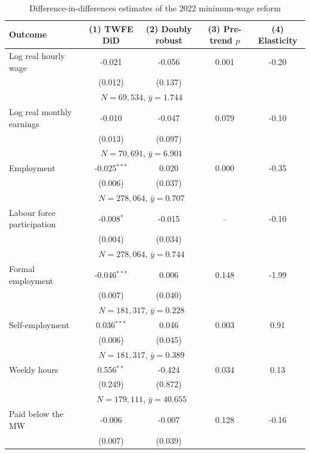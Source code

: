 \begin{table}[!tbp]\centering
\caption{Difference-in-differences estimates of the 2022 minimum-wage reform}\label{tab:main}
\begin{threeparttable}
\footnotesize
\setlength{\tabcolsep}{4pt}
\begin{tabular}{lcccc}
\toprule
Outcome & (1) TWFE DiD & (2) Doubly robust & (3) Pre-trend $p$ & (4) Elasticity \\
\midrule
Log real hourly wage & -0.021 & -0.056 & 0.001 & -0.20 \\
 & (0.012) & (0.137) & & \\
 & \multicolumn{2}{c}{\footnotesize $N=69,534$, $\bar{y}=1.744$} & & \\
Log real monthly earnings & -0.010 & -0.047 & 0.079 & -0.10 \\
 & (0.013) & (0.097) & & \\
 & \multicolumn{2}{c}{\footnotesize $N=70,691$, $\bar{y}=6.901$} & & \\
Employment & -0.025$^{***}$ & 0.020 & 0.000 & -0.35 \\
 & (0.006) & (0.037) & & \\
 & \multicolumn{2}{c}{\footnotesize $N=278,064$, $\bar{y}=0.707$} & & \\
Labour force participation & -0.008$^{*}$ & -0.015 & -- & -0.10 \\
 & (0.004) & (0.034) & & \\
 & \multicolumn{2}{c}{\footnotesize $N=278,064$, $\bar{y}=0.744$} & & \\
Formal employment & -0.046$^{***}$ & 0.006 & 0.148 & -1.99 \\
 & (0.007) & (0.040) & & \\
 & \multicolumn{2}{c}{\footnotesize $N=181,317$, $\bar{y}=0.228$} & & \\
Self-employment & 0.036$^{***}$ & 0.046 & 0.003 & 0.91 \\
 & (0.006) & (0.045) & & \\
 & \multicolumn{2}{c}{\footnotesize $N=181,317$, $\bar{y}=0.389$} & & \\
Weekly hours & 0.556$^{**}$ & -0.424 & 0.034 & 0.13 \\
 & (0.249) & (0.872) & & \\
 & \multicolumn{2}{c}{\footnotesize $N=179,111$, $\bar{y}=40.655$} & & \\
Paid below the MW & -0.006 & -0.007 & 0.128 & -0.16 \\
 & (0.007) & (0.039) & & \\

\end{tabular}
\end{threeparttable}
\end{table}
